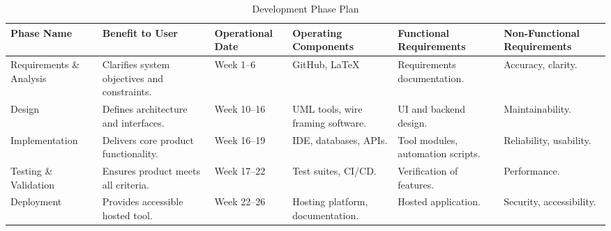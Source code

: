 \documentclass[12pt]{article}
\newcommand{\lips}{\textit{Insert your content here.}}
\begin{document}
\begin{table}[H]
\centering
\caption{Development Phase Plan}
\setlength{\tabcolsep}{4pt}
\renewcommand{\arraystretch}{1.2}
\footnotesize

\begin{tabularx}{\textwidth}{p{2.5cm} Y p{2cm} Y Y Y}
\toprule
\textbf{Phase Name} & \textbf{Benefit to User} & \textbf{Operational Date} &
\textbf{Operating Components} & \textbf{Functional Requirements} &
\textbf{Non-Functional Requirements} \\
\midrule
{}

Requirements \& Analysis &
Clarifies system objectives and constraints. &
Week 1–6 &
GitHub, LaTeX &
Requirements documentation. &
Accuracy, clarity. \\
\hline
Design &
Defines architecture and interfaces. &
Week 10–16 &
UML tools, wire framing software. &
UI and backend design. &
Maintainability. \\
\hline
Implementation &
Delivers core product functionality. &
Week 16–19 &
IDE, databases, APIs. &
Tool modules, automation scripts. &
Reliability, usability. \\
\hline
Testing \& Validation &
Ensures product meets all criteria. &
Week 17–22 &
Test suites, CI/CD. &
Verification of features. &
Performance. \\
\hline
Deployment &
Provides accessible hosted tool. &
Week 22–26 &
Hosting platform, documentation. &
Hosted application. &
Security, accessibility. \\
\bottomrule
\end{tabularx}
\end{table}



\end{document}
